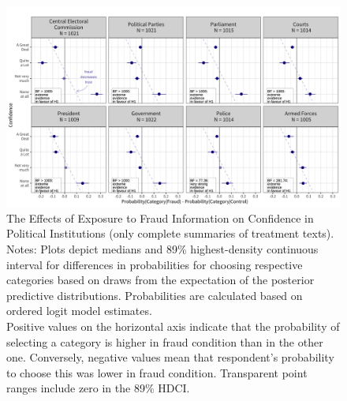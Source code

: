 \documentclass[11pt, ngerman,english,a4]{article}
\begin{document}
\begin{figure}[H]
	\centering
	\includegraphics[width=\linewidth,trim=4 4 4 4,clip]{figs/diffs_ol_main_pol_correct_control.png}
	\caption{The Effects of Exposure to Fraud Information on Confidence in Political Institutions (only complete summaries of treatment texts).  \\
		\footnotesize{Notes: Plots depict medians and 89\% highest-density continuous interval for differences in probabilities for choosing respective categories based on draws from the expectation of the posterior predictive distributions. Probabilities are calculated based on ordered logit model estimates.\\
			Positive values on the horizontal axis indicate that the probability of selecting a category is higher in fraud condition than in the other one. Conversely, negative values mean that respondent's probability to choose this was lower in fraud condition. 
Transparent point ranges include zero in the 89\% HDCI.\\
	} }
	\singlespacing
	\raggedright
	    
	\label{fig:diffs_ol_main_pol_correct_control}
\end{figure}
\end{document}
